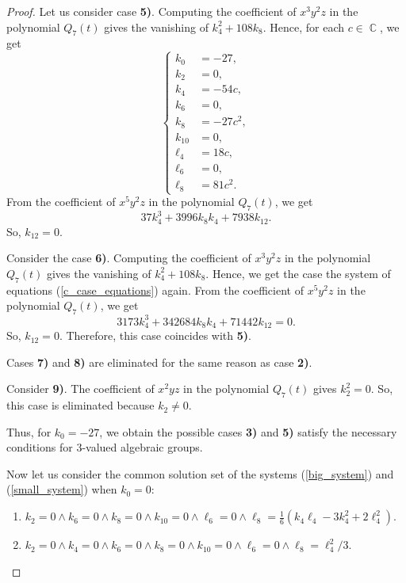 \documentclass[14pt, dvipsnames]{extarticle}
\theoremstyle{definition}
\theoremstyle{definition}
\theoremstyle{remark}
\DeclareMathOperator{\Cc}{\mathbb{C}}
\begin{document}
\begin{proof}
Let us consider case {\bf 5)}.  Computing the coefficient of $x^3y^2z$ in the polynomial $Q_7(t)$ gives the vanishing of $k_4^2 + 108k_8$. Hence, for each $c\in\Cc$, we get \begin{equation}\left\{\begin{aligned}\label{c_case_equations}k_0 &= -27,\\ k_2 &= 0,\\ k_4 &= -54c,\\ k_6 &= 0,\\ k_8 &= -27c^2,\\ k_{10} &= 0,\\ \ell_4 &= 18c,\\ \ell_6 &= 0,\\ \ell_8 &= 81c^2. \end{aligned}\right.\end{equation} From the coefficient of $x^5y^2z$ in the polynomial $Q_7(t)$, we get $$37 k_4^3+3996 k_8 k_4+7938 k_{12}.$$ So, $k_{12} = 0$.


Consider the case {\bf 6)}. Computing the coefficient of $x^3y^2z$ in the polynomial $Q_7(t)$ gives the vanishing of $k_4^2 + 108k_8$. Hence, we get the case the system of equations (\ref{c_case_equations}) again. From the coefficient of $x^5y^2z$ in the polynomial $Q_7(t)$, we get $$3173 k_4^3+342684 k_8 k_4+71442 k_{12} = 0.$$ So, $k_{12} = 0$. Therefore, this case coincides with {\bf 5)}. 

Cases {\bf 7)} and {\bf 8)} are eliminated for the same reason as case {\bf 2)}.

Consider {\bf 9)}. The coefficient of $x^2yz$ in the polynomial $Q_7(t)$ gives $k_2^2 = 0$. So, this case is eliminated because $k_2\neq 0$.

Thus, for $k_0 = -27$, we obtain the possible cases {\bf 3)} and {\bf 5)} satisfy the necessary conditions for 3-valued algebraic groups. 

Now let us consider the common solution set of the systems (\ref{big_system}) and (\ref{small_system}) when $k_0 = 0$:

\begin{enumerate}[\bf 1)]

\item $k_2=0\land k_6=0\land k_8=0\land k_{10}=0\land \ell_6=0\land \ell_8=\frac{1}{6} \left(k_4 \ell_4-3 k_4^2+2 \ell_4^2\right)$.

\item $k_2=0\land k_4=0\land k_6=0\land k_8=0\land k_{10}=0\land \ell_6=0\land \ell_8=\ell_4^2/3$.


\end{enumerate}
\end{proof}
\end{document}
